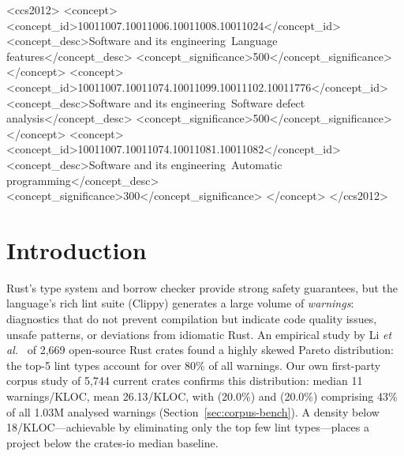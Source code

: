 \documentclass[sigconf,review,anonymous]{acmart}
\newcommand{\etal}{\textit{et al.}\xspace}
\newcommand{\tcode}{\path}
\begin{document}
\begin{CCSXML}
  <ccs2012>
  <concept>
  <concept_id>10011007.10011006.10011008.10011024</concept_id>
  <concept_desc>Software and its engineering~Language features</concept_desc>
  <concept_significance>500</concept_significance>
  </concept>
  <concept>
  <concept_id>10011007.10011074.10011099.10011102.10011776</concept_id>
  <concept_desc>Software and its engineering~Software defect analysis</concept_desc>
  <concept_significance>500</concept_significance>
  </concept>
  <concept>
  <concept_id>10011007.10011074.10011081.10011082</concept_id>
  <concept_desc>Software and its engineering~Automatic programming</concept_desc>
  <concept_significance>300</concept_significance>
  </concept>
  </ccs2012>
\end{CCSXML}



\maketitle

\section{Introduction}\label{sec:intro}

Rust's type system and borrow checker provide strong safety guarantees, but
the language's rich lint suite (Clippy) generates a large volume of
\emph{warnings}: diagnostics that do not prevent compilation but indicate
code quality issues, unsafe patterns, or deviations from idiomatic Rust.
An empirical study by Li \etal~\cite{li2023unleash} of 2,669 open-source Rust
crates found a highly skewed Pareto distribution: the top-5 lint types account
for over 80\% of all warnings.
Our own first-party corpus study of 5,744 current crates confirms this
distribution: median 11\,warnings/KLOC, mean 26.13/KLOC, with
\tcode{arithmetic\_side\_effects} (20.0\%) and \tcode{as\_conversions}
(20.0\%) comprising 43\% of all 1.03M analysed warnings
(Section~\ref{sec:corpus-bench}).
A density below 18/KLOC---achievable by eliminating only the top few lint
types---places a project below the crates-io median baseline.
\end{document}

